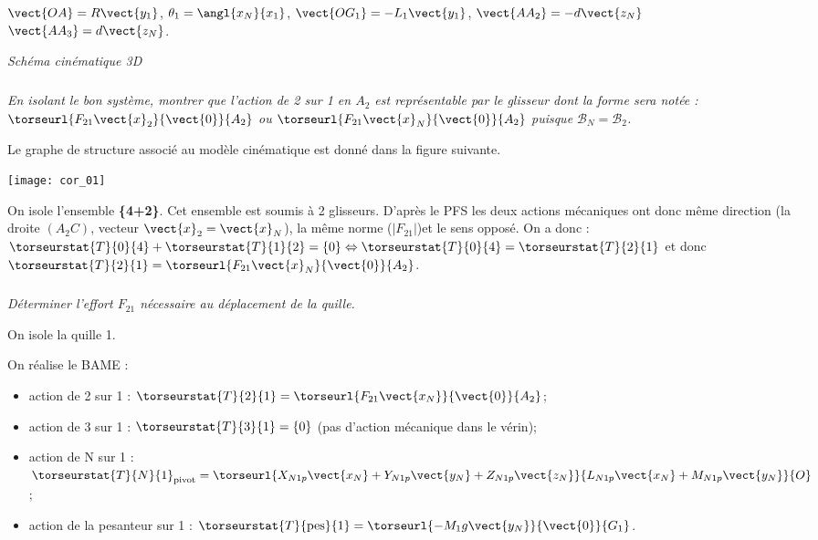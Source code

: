 \begin{multicols}{2}
\begin{center}

$\vect{OA}=R\vect{y_1}$, 
$\theta_1 =\angl{x_N}{x_1}$,
$\vect{OG_1}=-L_1\vect{y_1}$,
$\vect{AA_2}=-d\vect{z_N}$
$\vect{AA_3}=d\vect{z_N} $.


\textit{Schéma cinématique 3D}
\end{center}
\fi
\subparagraph{}\textit{
En isolant le bon système, montrer que l’action de 2 sur 1 en $A_2$ est représentable par le glisseur dont la forme sera notée : $\torseurl{F_{21}\vect{x}_2}{\vect{0}}{A_2}$ ou 
$\torseurl{F_{21}\vect{x}_N}{\vect{0}}{A_2}$ puisque $\mathcal{B}_N=\mathcal{B}_2$.}
\ifprof
\begin{corrige}
\begin{multicols}{2}
Le graphe de structure associé au modèle cinématique est donné dans la figure suivante. 
\begin{center}
\texttt{[image: cor\_01]}
\end{center}

On isole l'ensemble \textbf{\{4+2\}}. Cet ensemble est soumis à 2 glisseurs. D'après le PFS les deux actions mécaniques ont donc même direction (la droite $(A_2C)$, vecteur $\vect{x}_2=\vect{x}_N$), la même norme ($\left|F_{21} \right|$)et le sens opposé. On a donc : $\torseurstat{T}{0}{4}+\torseurstat{T}{1}{2}=\{0\} \Leftrightarrow \torseurstat{T}{0}{4}=\torseurstat{T}{2}{1}$ et donc  $\torseurstat{T}{2}{1}=\torseurl{F_{21}\vect{x}_N}{\vect{0}}{A_2}$.
\end{multicols}
\end{corrige}
\else
\fi

\subparagraph{}\textit{
Déterminer l'effort $F_{21}$ nécessaire au déplacement de la quille.}
\ifprof
\begin{corrige}
On isole la quille 1. 

On réalise le BAME : 
\begin{itemize}
\item action de 2 sur 1 : $\torseurstat{T}{2}{1}=\torseurl{F_{21}\vect{x_N}}{\vect{0}}{A_2}$;
\item action de 3 sur 1 : $\torseurstat{T}{3}{1}=\{0\}$ (pas d'action mécanique dans le vérin);
\item action de N sur 1 : $\torseurstat{T}{N}{1}_{\text{pivot}}=\torseurl{X_{N1p}\vect{x_N}+Y_{N1p}\vect{y_N}+Z_{N1p}\vect{z_N}}{L_{N1p}\vect{x_N}+M_{N1p}\vect{y_N}}{O}$;
\item action de la pesanteur sur 1 : $\torseurstat{T}{\text{pes}}{1}=\torseurl{-M_1g\vect{y_N}}{\vect{0}}{G_1}$.
\end{itemize}


\end{corrige}
\end{multicols}
